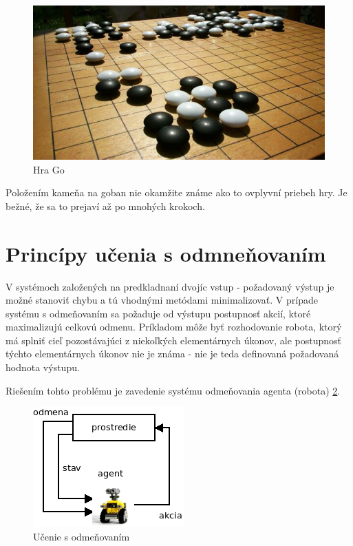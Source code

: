\begin{figure}[!htb]
\center
\includegraphics[scale=.5]{../pictures/go2.jpg}
\caption{Hra Go}
\label{img:go_game}
\end{figure}

Položením kameňa na goban nie okamžite známe ako to ovplyvní priebeh hry.
Je bežné, že sa to prejaví až po mnohých krokoch.


\section{Princípy učenia s odmneňovaním}

V systémoch založených na predkladnaní dvojíc vstup - požadovaný výstup
je možné stanoviť chybu a tú vhodnými metódami minimalizovať.
V prípade systému s odmeňovaním sa požaduje od výstupu postupnosť
akcií, ktoré maximalizujú celkovú odmenu.
Príkladom môže byť rozhodovanie robota, ktorý má splniť cieľ pozostávajúci z
niekoľkých elementárnych úkonov, ale postupnosť týchto elementárnych úkonov nie je známa -
nie je teda definovaná požadovaná hodnota výstupu.

Riešením tohto problému je zavedenie systému odmeňovania agenta (robota) \ref{img:reinforcement_learning}.

\begin{figure}[!htb]
\center
\includegraphics[scale=.8]{../diagrams/agent.png}
\caption{Učenie s odmeňovaním}
\label{img:reinforcement_learning}
\end{figure}

